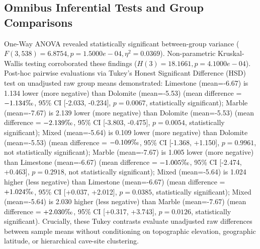 \documentclass[sn-basic,Numbered]{sn-jnl}%
\begin{document}
\subsection{Omnibus Inferential Tests and Group Comparisons}
One-Way ANOVA revealed statistically significant between-group variance ($F(3, 538) = 6.8754, p = 1.5000e-04, \eta^2 = 0.0369$). Non-parametric Kruskal-Wallis testing corroborated these findings ($H(3) = 18.1661, p = 4.1000e-04$). Post-hoc pairwise evaluations via Tukey's Honest Significant Difference (HSD) test on unadjusted raw group means demonstrated: Limestone (mean=-6.67) is 1.134 lower (more negative) than Dolomite (mean=-5.53) (mean difference = $-1.134\text{\textperthousand}$, 95\% CI [-2.033, -0.234], $p = 0.0067$, statistically significant); Marble (mean=-7.67) is 2.139 lower (more negative) than Dolomite (mean=-5.53) (mean difference = $-2.139\text{\textperthousand}$, 95\% CI [-3.803, -0.475], $p = 0.0054$, statistically significant); Mixed (mean=-5.64) is 0.109 lower (more negative) than Dolomite (mean=-5.53) (mean difference = $-0.109\text{\textperthousand}$, 95\% CI [-1.368, +1.150], $p = 0.9961$, not statistically significant); Marble (mean=-7.67) is 1.005 lower (more negative) than Limestone (mean=-6.67) (mean difference = $-1.005\text{\textperthousand}$, 95\% CI [-2.474, +0.463], $p = 0.2918$, not statistically significant); Mixed (mean=-5.64) is 1.024 higher (less negative) than Limestone (mean=-6.67) (mean difference = $+1.024\text{\textperthousand}$, 95\% CI [+0.037, +2.012], $p = 0.0385$, statistically significant); Mixed (mean=-5.64) is 2.030 higher (less negative) than Marble (mean=-7.67) (mean difference = $+2.030\text{\textperthousand}$, 95\% CI [+0.317, +3.743], $p = 0.0126$, statistically significant). Crucially, these Tukey contrasts evaluate unadjusted raw differences between sample means without conditioning on topographic elevation, geographic latitude, or hierarchical cave-site clustering.
\end{document}

